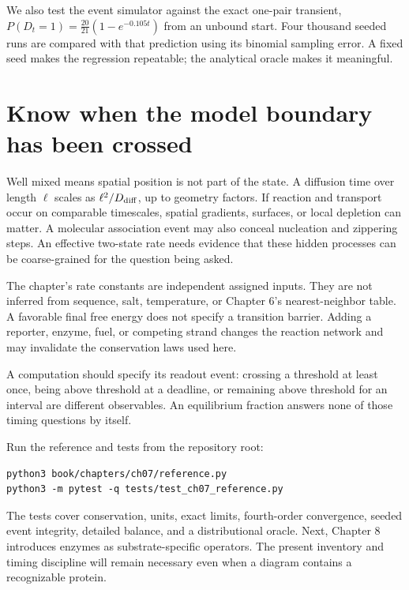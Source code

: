 We also test the event simulator against the exact one-pair transient,
$P(D_t=1)=\frac{20}{21}(1-e^{-0.105t})$ from an unbound start.
Four thousand seeded runs are compared with that prediction using its
binomial sampling error. A fixed seed makes the regression repeatable;
the analytical oracle makes it meaningful.

\section{Know when the model boundary has been crossed}

Well mixed means spatial position is not part of the state. A diffusion
time over length $\ell$ scales as $\ell^2/D_{\rm diff}$, up to geometry
factors. If reaction and transport occur on comparable timescales,
spatial gradients, surfaces, or local depletion can matter. A molecular
association event may also conceal nucleation and zippering steps.
An effective two-state rate needs evidence that these hidden processes
can be coarse-grained for the question being asked.

The chapter's rate constants are independent assigned inputs. They are
not inferred from sequence, salt, temperature, or Chapter 6's nearest-neighbor
table. A favorable final free energy does not specify a transition barrier.
Adding a reporter, enzyme, fuel, or competing strand changes the reaction
network and may invalidate the conservation laws used here.

A computation should specify its readout event: crossing a threshold
at least once, being above threshold at a deadline, or remaining above
threshold for an interval are different observables. An equilibrium
fraction answers none of those timing questions by itself.

Run the reference and tests from the repository root:
\begin{Verbatim}[fontsize=\small]
python3 book/chapters/ch07/reference.py
python3 -m pytest -q tests/test_ch07_reference.py
\end{Verbatim}
The tests cover conservation, units, exact limits, fourth-order convergence,
seeded event integrity, detailed balance, and a distributional oracle.
Next, Chapter 8 introduces enzymes as substrate-specific operators.
The present inventory and timing discipline will remain necessary even
when a diagram contains a recognizable protein.

